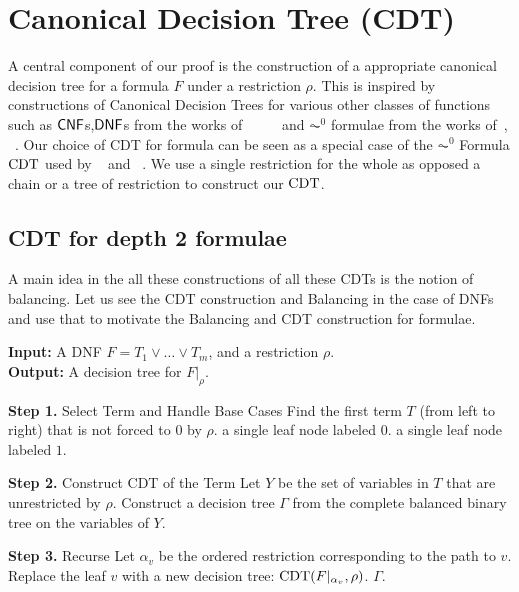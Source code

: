 \section{Canonical Decision Tree (CDT)}
\label{sec:cdt}


A central component of our proof is the construction of a appropriate canonical decision tree for a \demorgan formula $F$ under a restriction $\rho$.
This is inspired by constructions of Canonical Decision Trees for various other classes of functions such as $\mathsf{CNF}$s,$\mathsf{DNF}$s from the works of ~\cite{hastad1986smalldepththesis} ~\cite{razborov1993equivalence} ~\cite{beame1994switching}  and $\AC^0$ formulae from the works of~\cite{rossmanCriticalityRegularFormulas2019}, ~\cite{hastad2014parity}. Our choice of CDT for \demorgan formula can be seen as a special case of the $\AC^0$ Formula $\operatorname{CDT}$ used by ~\cite{rossmanCriticalityRegularFormulas2019} and ~\cite{harshaCriticalityAC0Formulae2023}. We use a single restriction for the whole as opposed a chain or a tree of restriction to construct our $\operatorname{CDT}$.

\subsection{CDT for depth 2 formulae}
A main idea in the all these constructions of all these CDTs is the notion of balancing. Let us see the CDT construction and Balancing in the case of DNFs and use that to motivate the Balancing and CDT construction for \demorgan formulae. 

\begin{algorithm}[H]
    \caption{$\CDT(F, \rho)$: Canonical Decision Tree for DNF}
    \label{alg:dnf-cdt}
    \textbf{Input:} A DNF $F = T_1 \lor \dots \lor T_m$, and a restriction $\rho$. \\
    \textbf{Output:} A decision tree for $F|_{\rho}$.
    \begin{algorithmic}[1]
        \Statex \textbf{Step 1.} Select Term and Handle Base Cases
        \State Find the first term $T$ (from left to right) that is not forced to $0$ by $\rho$.
            \State \Return a single leaf node labeled $0$. 
        \EndIf
            \State \Return a single leaf node labeled $1$. 
        \EndIf
        
        \Statex \textbf{Step 2.} Construct CDT of the Term
        \State Let $Y$ be the set of variables in $T$ that are unrestricted by $\rho$.
        \State Construct a decision tree $\Gamma$ from the complete balanced binary tree on the variables of $Y$.
        
        \Statex \textbf{Step 3.} Recurse
            \State Let $\alpha_v$ be the ordered restriction corresponding to the path to $v$.
            \State Replace the leaf $v$ with a new decision tree: $\operatorname{CDT}(F|_{\alpha_v}, \rho)$.
        \EndFor
        \State \Return $\Gamma$.
    \end{algorithmic}
\end{algorithm}

